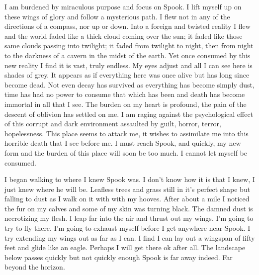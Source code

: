 I am burdened by miraculous purpose and focus on Spook. I lift myself up on these wings of glory and follow a mysterious path. I flew not in any of the directions of a compass, nor up or down. Into a foreign and twisted reality I flew and the world faded like a thick cloud coming over the sun; it faded like those same clouds passing into twilight; it faded from twilight to night, then from night to the darkness of a cavern in the midst of the earth. Yet once consumed by this new reality I find it is vast, truly endless. My eyes adjust and all I can see here is shades of grey. It appears as if everything here was once alive but has long since become dead. Not even decay has survived as everything has become simply dust, time has had no power to consume that which has been and death has become immortal in all that I see. The burden on my heart is profound, the pain of the descent of oblivion has settled on me. I am raging against the psychological effect of this corrupt and dark environment assaulted by guilt, horror, terror, hopelessness. This place seems to attack me, it wishes to assimilate me into this horrible death that I see before me. I must reach Spook, and quickly, my new form and the burden of this place will soon be too much. I cannot let myself be consumed.

I began walking to where I knew Spook was. I don't know how it is that I knew, I just knew where he will be. Leafless trees and grass still in it's perfect shape but falling to dust as I walk on it with with my hooves. After about a mile I noticed the fur on my calves and some of my skin was turning black. The damned dust is necrotizing my flesh. I leap far into the air and thrust out my wings. I'm going to try to fly there. I'm going to exhaust myself before I get anywhere near Spook. I try extending my wings out as far as I can. I find I can lay out a wingspan of fifty feet and glide like an eagle. Perhaps I will get there ok after all. The landscape below passes quickly but not quickly enough Spook is far away indeed. Far beyond the horizon.




















